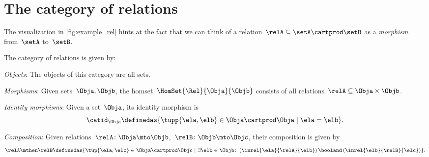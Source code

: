 

\section{The category of relations \Rel}

The visualization in \cref{fig:example_rel} hints at the fact that we can think of a relation~$\relA \subseteq \setA \cartprod \setB$ as a \emph{morphism} from~$\setA$ to~$\setB$.


\begin{ctdefinition}
    \label{def:Rel}
    The category of relations \iindex{\Rel}  is given by:
    \begin{compactenum}
        \item \emph{Objects}: The objects of this category are all sets.
        \item \emph{Morphisms}: Given sets~$\Obja, \Objb$, the homset~$\HomSet{\Rel}{\Obja}{\Objb}$ consists of all relations~$\relA\subseteq \Obja\times \Objb$.
        \item \emph{Identity morphisms}: Given a set~$\Obja$, its identity morphism is
              \begin{equation}
                  \catid_\Obja \definedas \{ \tupp{\ela,\elb} \in \Obja \cartprod \Obja \mid  \ela = \elb \}.
              \end{equation}
        \item \emph{Composition}: Given relations~$\relA \colon \Obja\mto \Objb$,~$\relB \colon \Objb\mto \Objc$, their composition is given by
              \begin{equation}
                  \label{eq:RelCompRule}
                  \relA \mthen \relB \definedas \{\tup{\ela,\elc} \in \Obja \cartprod \Objc \mid  \exists \elb \in \Objb \colon \left(\inrel{\ela}{\relA}{\elb} \right) \booland \left(\inrel{\elb}{\relB}{\elc}\right)\}.
              \end{equation}
    \end{compactenum}
\end{ctdefinition}

